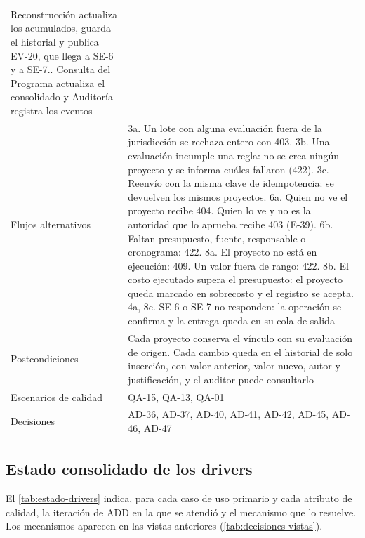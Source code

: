 \documentclass[11pt,letterpaper]{article}
\begin{document}
\begin{longtable}{L{3.2cm} L{12.6cm}}
Reconstrucción actualiza los acumulados, guarda el historial y publica EV-20, que llega a SE-6 y a
SE-7.. Consulta del Programa actualiza el consolidado y Auditoría registra los eventos \\
Flujos alternativos &
3a. Un lote con alguna evaluación fuera de la jurisdicción se rechaza entero con 403.\newline
3b. Una evaluación incumple una regla: no se crea ningún proyecto y se informa cuáles fallaron (422).\newline
3c. Reenvío con la misma clave de idempotencia: se devuelven los mismos proyectos.\newline
6a. Quien no ve el proyecto recibe 404. Quien lo ve y no es la autoridad que lo aprueba recibe 403
(E-39).\newline
6b. Faltan presupuesto, fuente, responsable o cronograma: 422.\newline
8a. El proyecto no está en ejecución: 409. Un valor fuera de rango: 422.\newline
8b. El costo ejecutado supera el presupuesto: el proyecto queda marcado en sobrecosto y el registro se
acepta.\newline
4a, 8c. SE-6 o SE-7 no responden: la operación se confirma y la entrega queda en su cola de salida \\
Postcondiciones & Cada proyecto conserva el vínculo con su evaluación de origen. Cada cambio queda en
el historial de solo inserción, con valor anterior, valor nuevo, autor y justificación, y el auditor
puede consultarlo \\
Escenarios de calidad & QA-15, QA-13, QA-01 \\
Decisiones & AD-36, AD-37, AD-40, AD-41, AD-42, AD-45, AD-46, AD-47 \\
\end{longtable}

\subsection{Estado consolidado de los drivers}

El \cref{tab:estado-drivers} indica, para cada caso de uso primario y cada atributo de calidad, la
iteración de ADD en la que se atendió y el mecanismo que lo resuelve. Los mecanismos aparecen en
las vistas anteriores (\cref{tab:decisiones-vistas}).
\end{document}
